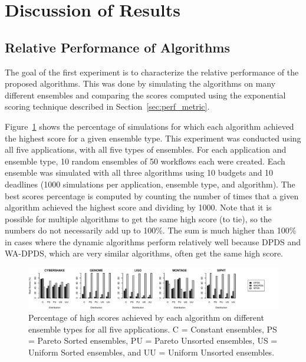 \documentclass[conference]{IEEEtran}
\begin{document}
\section{Discussion of Results}
\label{sec:results}



\subsection{Relative Performance of Algorithms}

The goal of the first experiment is to characterize the relative performance
of the proposed algorithms. This was done by simulating the algorithms on many
different ensembles and comparing the scores computed using the exponential
scoring technique described in Section~\ref{sec:perf_metric}.

Figure~\ref{fig:distributions} shows the percentage of simulations for which
each algorithm achieved the highest score for a given ensemble type. This
experiment was conducted using all five applications, with all five types of
ensembles. For each application and ensemble type, 10 random ensembles of 50
workflows each were created. Each ensemble was simulated with all three
algorithms using 10 budgets and 10 deadlines (1000 simulations per
application, ensemble type, and algorithm). The best scores percentage is
computed by counting the number of times that a given algorithm achieved the
highest score and dividing by 1000. Note that it is possible for multiple
algorithms to get the same high score (to tie), so the numbers do not
necessarily add up to 100\%. The sum is much higher than 100\% in cases where
the dynamic algorithms perform relatively well because DPDS and WA-DPDS, which
are very similar algorithms, often get the same high score.

\begin{figure}[ht]
    \centering
    \includegraphics[width=\textwidth]{run-finish-variations-test-0-output-distributions}
    \caption{Percentage of high scores achieved by each algorithm on different ensemble types for all five applications. C = Constant ensembles, PS = Pareto Sorted ensembles, PU = Pareto Unsorted ensembles, US = Uniform Sorted ensembles, and UU = Uniform Unsorted ensembles.} 
    \label{fig:distributions}
\end{figure}
\end{document}
